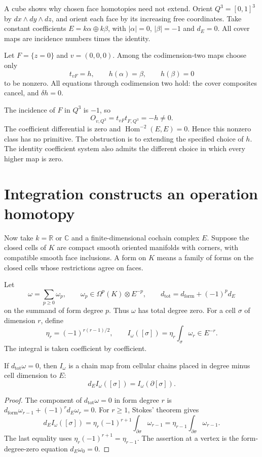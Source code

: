 A cube shows why chosen face homotopies need not extend.
Orient $Q^3=[0,1]^3$ by $dx\wedge dy\wedge dz$,
and orient each face by its increasing free coordinates.
Take constant coefficients
$E=k\alpha\oplus k\beta$, with $|\alpha|=0$, $|\beta|=-1$ and $d_E=0$.
All cover maps are incidence numbers times the identity.

Let $F=\{z=0\}$ and $v=(0,0,0)$.
Among the codimension-two maps choose only
\[
 t_{vF}=h,\qquad h(\alpha)=\beta,\qquad h(\beta)=0
\]
to be nonzero.
All equations through codimension two hold: the cover composites cancel,
and $\delta h=0$.

The incidence of $F$ in $Q^3$ is $-1$, so
\[
 O_{v,Q^3}=t_{vF}t_{F,Q^3}=-h\ne0.
\]
The coefficient differential is zero and
$\operatorname{Hom}^{-2}(E,E)=0$.
Hence this nonzero class has no primitive.
The obstruction is to extending the specified choice of $h$.
The identity coefficient system also admits the different choice
in which every higher map is zero.

\section{Integration constructs an operation homotopy}
Now take $k=\mathbb R$ or $\mathbb C$ and a finite-dimensional cochain
complex $E$.
Suppose the closed cells of $K$ are compact smooth oriented manifolds
with corners, with compatible smooth face inclusions.
A form on $K$ means a family of forms on the closed cells whose
restrictions agree on faces.

Let
\[
 \omega=\sum_{p\ge0}\omega_p,
 \qquad \omega_p\in\Omega^p(K)\otimes E^{-p},
 \qquad d_{\mathrm{tot}}=d_{\mathrm{form}}+(-1)^p d_E
\]
on the summand of form degree $p$.
Thus $\omega$ has total degree zero.
For a cell $\sigma$ of dimension $r$, define
\begin{equation}\label{eq:signed-cell-integration}
 \eta_r=(-1)^{r(r-1)/2},\qquad
 I_\omega([\sigma])=\eta_r\int_\sigma\omega_r\in E^{-r}.
\end{equation}
The integral is taken coefficient by coefficient.

\begin{proposition}\label{prop:signed-stokes-map}
If $d_{\mathrm{tot}}\omega=0$, then $I_\omega$ is a chain map
from cellular chains placed in degree minus cell dimension to $E$:
\[
 d_E I_\omega([\sigma])=I_\omega(\partial[\sigma]).
\]
\end{proposition}
\begin{proof}
The component of $d_{\mathrm{tot}}\omega=0$ in form degree $r$ is
$d_{\mathrm{form}}\omega_{r-1}+(-1)^r d_E\omega_r=0$.
For $r\ge1$, Stokes' theorem gives
\[
 d_E I_\omega([\sigma])
 =\eta_r(-1)^{r+1}\int_{\partial\sigma}\omega_{r-1}
 =\eta_{r-1}\int_{\partial\sigma}\omega_{r-1}.
\]
The last equality uses
$\eta_r(-1)^{r+1}=\eta_{r-1}$.
The assertion at a vertex is the form-degree-zero equation
$d_E\omega_0=0$.
\end{proof}

